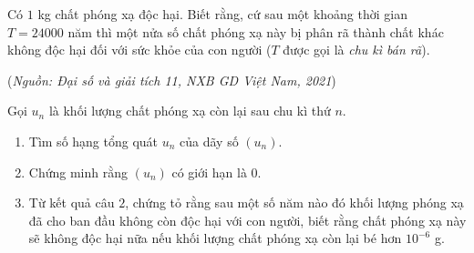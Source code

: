 \begin{bt}%

	Có $1$ kg chất phóng xạ độc hại. Biết rằng, cứ sau một khoảng thời gian $T=24000$ năm thì một nửa số chất phóng xạ này bị phân rã thành chất khác không độc hại đối với sức khỏe của con người ($T$ được gọi là \textit{chu kì bán rã}).
	\begin{flushright}
		(\textit{Nguồn: Đại số và giải tích 11, NXB GD Việt Nam, 2021})
	\end{flushright}
	Gọi $u_n$ là khối lượng chất phóng xạ còn lại sau chu kì thứ $n$.
	\begin{enumerate}
		\item  Tìm số hạng tổng quát $u_n$ của dãy số $(u_n)$.
		\item  Chứng minh rằng $(u_n)$ có giới hạn là $0$.
		\item  Từ kết quả câu $2$, chứng tỏ rằng sau một số năm nào đó khối lượng phóng xạ đã cho ban đầu không còn độc hại với con người, biết rằng chất phóng xạ này sẽ không độc hại nữa nếu khối lượng chất phóng xạ còn lại bé hơn $10^{-6}$ g.
	\end{enumerate}
\end{bt}


